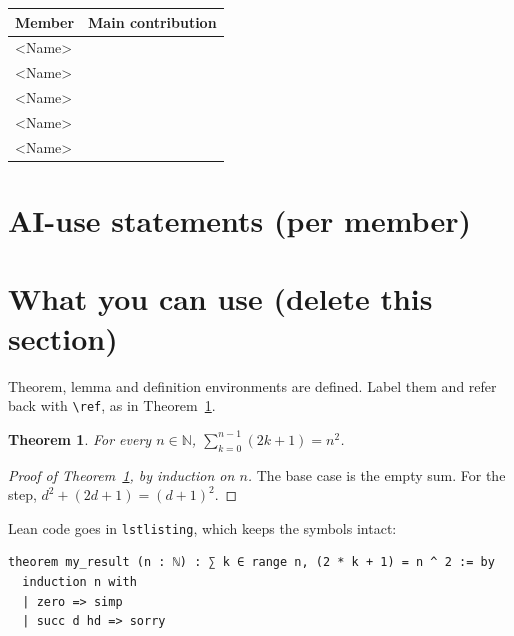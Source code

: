 \documentclass[11pt,a4paper]{article}
\newcommand{\lean}[1]{\texttt{#1}}
\newtheorem{theorem}{Theorem}
\begin{document}
\begin{center}
\begin{tabular}{@{}lp{11.5cm}@{}}
\toprule
\textbf{Member} & \textbf{Main contribution} \\
\midrule
<Name> &  \\
<Name> &  \\
<Name> &  \\
<Name> &  \\
<Name> &  \\
\bottomrule
\end{tabular}
\end{center}

\noindent %

\section{AI-use statements (per member)}

\section{What you can use (delete this section)}

Theorem, lemma and definition environments are defined. Label them and refer
back with \lean{\textbackslash ref}, as in Theorem~\ref{thm:example}.

\begin{theorem}\label{thm:example}
For every $n \in \mathbb{N}$, \quad
$\displaystyle\sum_{k=0}^{n-1}(2k+1) = n^2$.
\end{theorem}

\begin{proof}[Proof of Theorem~\ref{thm:example}, by induction on $n$]
The base case is the empty sum. For the step, $d^2 + (2d+1) = (d+1)^2$.
\end{proof}

Lean code goes in \lean{lstlisting}, which keeps the symbols intact:

\begin{lstlisting}
theorem my_result (n : ℕ) : ∑ k ∈ range n, (2 * k + 1) = n ^ 2 := by
  induction n with
  | zero => simp
  | succ d hd => sorry
\end{lstlisting}
\end{document}
